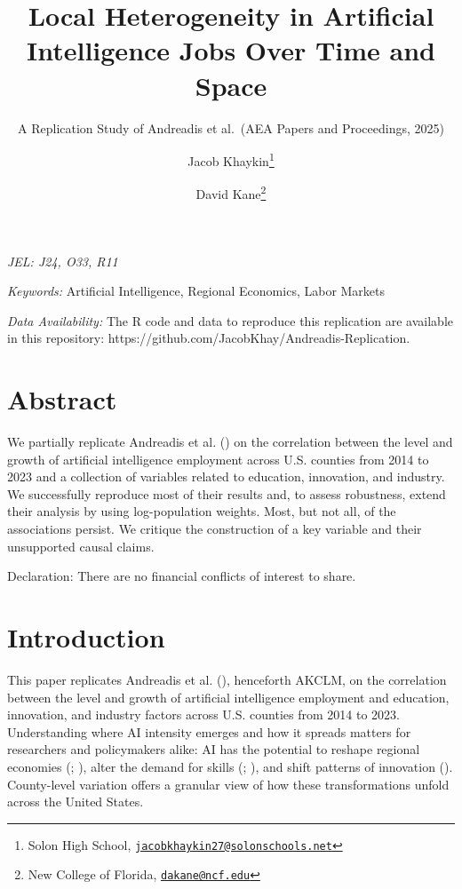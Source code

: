 \documentclass[
]{article}
\title{Local Heterogeneity in Artificial Intelligence Jobs Over Time and
Space}
\subtitle{A Replication Study of Andreadis et al.~(AEA Papers and
Proceedings, 2025)}
\author{Jacob Khaykin\footnote{Solon High School,
  \href{mailto:jacobkhaykin27@solonschools.net}{\nolinkurl{jacobkhaykin27@solonschools.net}}} \and David
Kane\footnote{New College of Florida,
  \href{mailto:dakane@ncf.edu}{\nolinkurl{dakane@ncf.edu}}}}
\date{}
\begin{document}
\maketitle


\emph{JEL: J24, O33, R11}

\emph{Keywords:} Artificial Intelligence, Regional Economics, Labor
Markets

\emph{Data Availability:} The R code and data to reproduce this
replication are available in this repository:
https://github.com/JacobKhay/Andreadis-Replication.

\section*{Abstract}\label{abstract}

We partially replicate Andreadis et al.
() on the correlation between the
level and growth of artificial intelligence employment across U.S.
counties from 2014 to 2023 and a collection of variables related to
education, innovation, and industry. We successfully reproduce most of
their results and, to assess robustness, extend their analysis by using
log-population weights. Most, but not all, of the associations persist.
We critique the construction of a key variable and their unsupported
causal claims.

Declaration: There are no financial conflicts of interest to share.

\newpage

\section{Introduction}\label{introduction}

This paper replicates Andreadis et al.
(), henceforth AKCLM, on the
correlation between the level and growth of artificial intelligence
employment and education, innovation, and industry factors across U.S.
counties from 2014 to 2023. Understanding where AI intensity emerges and
how it spreads matters for researchers and policymakers alike: AI has
the potential to reshape regional economies
(;
), alter the demand for skills
(;
), and shift patterns of innovation
(). County-level variation
offers a granular view of how these transformations unfold across the
United States.
\end{document}
